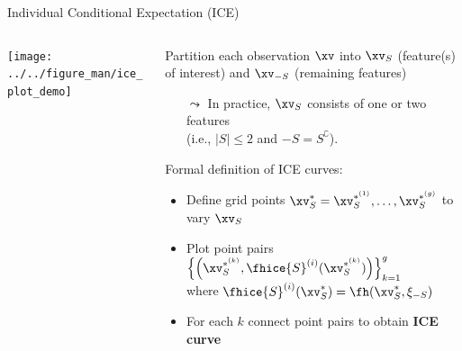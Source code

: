 \documentclass[11pt,compress,t,notes=noshow, aspectratio=169, xcolor=table]{beamer}
\begin{document}
\begin{frame}[c]{Individual Conditional Expectation (ICE) }

\begin{columns}[T, totalwidth=\textwidth]
\begin{column}{0.16\textwidth} %
\texttt{[image: ../../figure\_man/ice\_plot\_demo]}
\end{column}
\begin{column}{0.84\textwidth}


Partition each observation $\xv$ into $\xv_S$ (feature(s) of interest) and $\xv_{-S}$ (remaining features)
\begin{itemize}
    \item[$\leadsto$] In practice, $\xv_S$ consists of one or two features \\ (i.e., $|S| \leq 2$ and ${-S} = S^\complement$).
\end{itemize}

\medskip

Formal definition of ICE curves: 
\begin{itemize}
    \item Define grid points $\xv_S^* = \xv_S^{*^{(1)}}, \dots, \xv_S^{*^{(g)}}$ to vary $\xv_S$
    \item Plot point pairs $ \Bigl\{\left(\xv_S^{*^{(k)}}, \fhice{S}^{(i)}(\xv_S^{*^{(k)}}) \right) \Bigr\}_{k=1}^g$
    \\where $\fhice{S}^{(i)}(\xv_S^*) = \fh(\xv_S^*, \xi_{-S})$
    \item For each $k$ connect point pairs to obtain \textbf{ICE curve}
\end{itemize}


\end{column}
\end{columns}
\end{frame}
\end{document}
